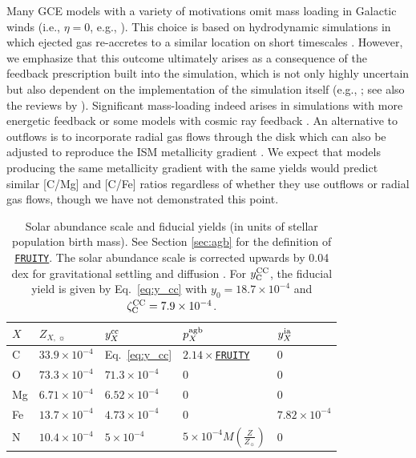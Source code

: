 \documentclass[fleqn,
usenatbib]{mnras}
\newcommand{\fruity}{\texttt{\hyperlink{fruity}{FRUITY}}}
\newcommand{\cfactor}{2.14}
\newcommand{\Ycc}{{y_{\rm C}^{\rm CC}}}
\newcommand{\y}{p}
\newcommand{\yo}{y_0}
\newcommand{\zcc}{\zeta_{\rm C}^{\rm CC}}
\newcommand{\Zo}{ Z_{\sun}}
\begin{document}
Many GCE models with a variety of motivations omit mass loading in Galactic winds (i.e., $\eta=0$, e.g., \citealt{spitoni19, spitoni20, spitoni21, palla+20}).
This choice is based on hydrodynamic simulations in which ejected gas re-accretes to a similar location on short timescales \citep[e.g.,][]{melioli+2008, melioli+2009, spitoni+2008, spitoni+2009, oppenheimer+dave2008, hopkins+2023}. However, we emphasize that this outcome ultimately arises as a consequence of the feedback prescription built into the simulation, which is not only highly uncertain but also dependent on the implementation of the simulation itself (e.g., \citealt{li+2020, hu+2023}; see also the reviews by \citealt{veilleux+2020, thompson+heckman2024}). 
Significant mass-loading indeed arises in simulations with more energetic feedback \citep[e.g.,][]{brook+2011, gutcke+2017, nelson+2019, peschken+2021, kopenhafer+2023} or some models with cosmic ray feedback \citep[e.g.,][]{bieri+2026, hopkins+2021}. 
An alternative to outflows is to incorporate radial gas flows through the disk  \citep[e.g.,][]{lacey+fall1985, portinary+chiosi2000, spitoni+matteucci2011, bilitewski+schonrich2012, pezzulli+fraternali2016} which can also be adjusted to reproduce the ISM metallicity gradient \citep[e.g.,][]{grisoni+2018, palla+20, james2025}. We expect that models producing the same metallicity gradient with the same yields would predict similar [C/Mg] and [C/Fe] ratios regardless of whether they use outflows or radial gas flows, though we have not demonstrated this point.

\begin{table}
	\centering
    \caption[]{Solar abundance scale and fiducial yields (in units of stellar population birth mass). See Section \ref{sec:agb} for the definition of \fruity. The solar abundance scale is \citet{magg+22} corrected upwards by 0.04 dex for gravitational settling and diffusion \citep{david_fe}. For $\Ycc$, the fiducial yield is given by Eq.~\ref{eq:y_cc} with $\yo=18.7\times10^{-4}$ and $\zcc=7.9\times10^{-4}$.
    }
	\label{tab:fiducial_mod}

	\begin{tabular}{l l l l l}
		\hline
         $X$ & $Z_{X,\,\sun}$ & $y_X^{\rm cc}$ & $\y_X^{\rm agb}$ & $y_X^{\rm ia}$  \\
		\hline
        C & $33.9\times10^{-4}$ & Eq.~\ref{eq:y_cc} & $\cfactor\times$\fruity &  0 \\
        O & $73.3\times10^{-4}$ & $71.3\times10^{-4}$ & 0 & 0 \\
        Mg & $6.71\times10^{-4}$ & $6.52\times 10^{-4}$ & 0 & 0 \\
        Fe & $13.7\times10^{-4}$ & $4.73\times10^{-4}$ & 0 & $7.82\times10^{-4}$ \\
        N & $10.4\times10^{-4}$ & $5\times10^{-4}$ & $5\times10^{-4}M\left(\frac{Z}{\Zo}\right)$ & 0\\
		\hline
	\end{tabular}
\end{table}
\end{document}
